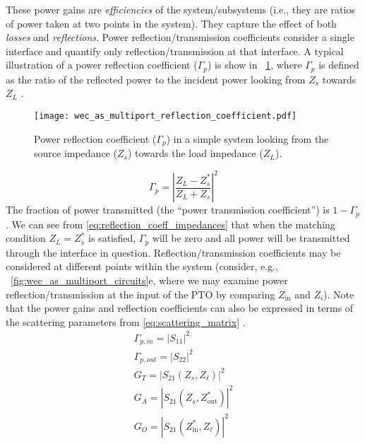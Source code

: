 \documentclass[5p,times]{elsarticle}
\begin{document}
These power gains are \emph{efficiencies} of the system/subsystems (i.e., they are ratios of power taken at two points in the system).
They capture the effect of both \emph{losses} and \emph{reflections}.
Power reflection/transmission coefficients consider a single interface and quantify only reflection/transmission at that interface.
A typical illustration of a power reflection coefficient ($\Gamma_p$) is show in \figurename~\ref{fig:wec_as_multiport_reflection_coefficient}, where $\Gamma_p$ is defined as the ratio of the reflected power to the incident power looking from $Z_s$ towards $Z_L$ \cite{Kurokawa:1965aa}.
%
\begin{figure}[tb]
        \centering
        \texttt{[image: wec\_as\_multiport\_reflection\_coefficient.pdf]}
        \caption{Power reflection coefficient ($\Gamma_p$) in a simple system looking from the source impedance ($Z_s$) towards the load impedance ($Z_L$).}
        \label{fig:wec_as_multiport_reflection_coefficient}
\end{figure}
%
\begin{equation}
        \Gamma_p =\left| \frac{Z_L - Z_s^*}{Z_L + Z_s} \right|^2
        \label{eq:reflection_coeff_impedances}
\end{equation}
%
The fraction of power transmitted (the ``power transmission coefficient'') is $1 - \Gamma_p$.
We can see from \eqref{eq:reflection_coeff_impedances} that when the matching condition $Z_L = Z_s^*$ is satisfied, $\Gamma_p$ will be zero and all power will be transmitted through the interface in question.
Reflection/transmission coefficients may be considered at different points within the system (consider, e.g., \figurename~\ref{fig:wec_as_multiport_circuits}e, where we may examine power reflection/transmission at the input of the PTO by comparing $Z_{\textrm{in}}$ and $Z_i$).
Note that the power gains and reflection coefficients can also be expressed in terms of the scattering parameters from \eqref{eq:scattering_matrix} \cite{Amakawa:2016aa}.
%
\begin{subequations}
\begin{gather}
        \Gamma_{p,in} = |S_{11}|^2 \\
        \Gamma_{p,out} = |S_{22}|^2 \\
        G_T = |S_{21}(Z_s, Z_\ell)|^2 \\ 
        G_A = |S_{21}(Z_s, Z_{\textrm{out}}^*)|^2 \\
        G_O = |S_{21}(Z_{\textrm{in}}^*, Z_\ell)|^2
\end{gather}
\end{subequations}
\end{document}
